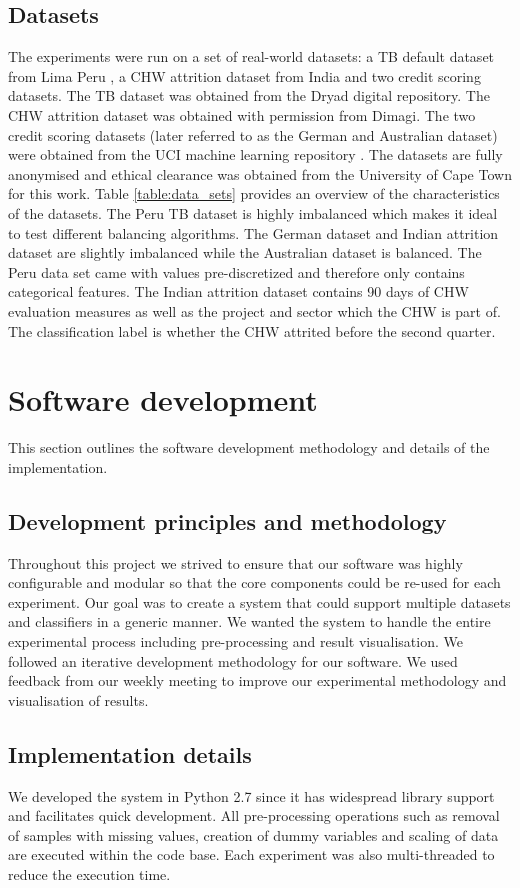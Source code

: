 \documentclass{sig-alternate-05-2015}
\begin{document}
	\subsection{Datasets}
	The experiments were run on a set of real-world datasets: a TB default dataset from Lima Peru \cite{Lackey:10356751520150601}, a CHW attrition dataset from India and two credit scoring datasets. The TB dataset was obtained from the Dryad digital repository. The CHW attrition dataset was obtained with permission from Dimagi. The two credit scoring datasets (later referred to as the German and Australian dataset) were obtained from the UCI machine learning repository \cite{Lichman:2013}. The datasets are fully anonymised and ethical clearance was obtained from the University of Cape Town for this work. Table \ref{table:data_sets} provides an overview of the characteristics of the datasets. The Peru TB dataset is highly imbalanced which makes it ideal to test different balancing algorithms. The German dataset and Indian attrition dataset are slightly imbalanced while the Australian dataset is balanced. The Peru data set came with values pre-discretized and therefore only contains categorical features. The Indian attrition dataset contains 90 days of CHW evaluation measures as well as the project and sector which the CHW is part of. The classification label is whether the CHW attrited before the second quarter.
	
	
	\section{Software development}
	This section outlines the software development methodology and details of the implementation.
	\subsection{Development principles and methodology}
	Throughout this project we strived to ensure that our software was highly configurable and modular so that the core components could be re-used for each experiment. Our goal was to create a system that could support multiple datasets and classifiers in a generic manner. We wanted the system to handle the entire experimental process including pre-processing and result visualisation. We followed an iterative development methodology for our software. We used feedback from our weekly meeting to improve our experimental methodology and visualisation of results.
	
	\subsection{Implementation details}
	We developed the system in Python 2.7 since it has widespread library support and facilitates quick development. All pre-processing operations such as removal of samples with missing values, creation of dummy variables and scaling of data are executed within the code base. Each experiment was also multi-threaded to reduce the execution time.
	
\end{document}

